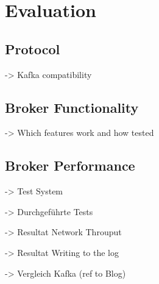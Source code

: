 \chapter{Evaluation}
\section{Protocol}
-> Kafka compatibility

\section{Broker Functionality}
-> Which features work and how tested 

\section{Broker Performance}
-> Test System

-> Durchgeführte Tests 

-> Resultat Network Throuput 

-> Resultat Writing to the log 

-> Vergleich Kafka (ref to Blog) 


